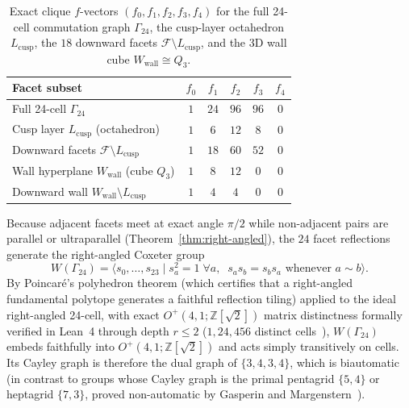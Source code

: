 \begin{table}[tb]
\centering
\caption{Exact clique $f$-vectors $(f_0, f_1, f_2, f_3, f_4)$ for the full 24-cell commutation graph $\Gamma_{24}$, the cusp-layer octahedron $L_{\mathrm{cusp}}$, the $18$ downward facets $\mathcal{F} \setminus L_{\mathrm{cusp}}$, and the 3D wall cube $W_{\mathrm{wall}} \cong Q_3$.}
\label{tab:clique-fvectors}
\small
\begin{tabular}{@{}lccccc@{}}
\toprule
Facet subset & $f_0$ & $f_1$ & $f_2$ & $f_3$ & $f_4$ \\
\midrule
Full 24-cell $\Gamma_{24}$ & $1$ & $24$ & $96$ & $96$ & $0$ \\
Cusp layer $L_{\mathrm{cusp}}$ (octahedron) & $1$ & $6$ & $12$ & $8$ & $0$ \\
Downward facets $\mathcal{F} \setminus L_{\mathrm{cusp}}$ & $1$ & $18$ & $60$ & $52$ & $0$ \\
Wall hyperplane $W_{\mathrm{wall}}$ (cube $Q_3$) & $1$ & $8$ & $12$ & $0$ & $0$ \\
Downward wall $W_{\mathrm{wall}} \setminus L_{\mathrm{cusp}}$ & $1$ & $4$ & $4$ & $0$ & $0$ \\
\bottomrule
\end{tabular}
\end{table}

Because adjacent facets meet at exact angle $\pi/2$ while non-adjacent pairs are parallel or ultraparallel (Theorem~\ref{thm:right-angled}), the $24$ facet reflections generate the right-angled Coxeter group~\cite{davis2008racg}
\begin{equation}
\label{eq:racg-pres}
W(\Gamma_{24}) = \bigl\langle s_0, \dots, s_{23} \;\big|\; s_a^2 = 1 \;\forall a,\;\; s_a s_b = s_b s_a \text{ whenever } a \sim b \bigr\rangle.
\end{equation}
By Poincar\'e's polyhedron theorem (which certifies that a right-angled fundamental polytope generates a faithful reflection tiling) applied to the ideal right-angled 24-cell, with exact $O^+(4,1;\mathbb{Z}[\sqrt{2}])$ matrix distinctness formally verified in Lean~4 through depth $r \le 2$ ($1, 24, 456$ distinct cells~\cite{pollard2026repo}), $W(\Gamma_{24})$ embeds faithfully into $O^+(4,1;\mathbb{Z}[\sqrt{2}])$ and acts simply transitively on cells. Its Cayley graph is therefore the dual graph of $\{3,4,3,4\}$, which is biautomatic~\cite{brink1993,davis2008racg} (in contrast to groups whose Cayley graph is the primal pentagrid $\{5,4\}$ or heptagrid $\{7,3\}$, proved non-automatic by Gasperin and Margenstern~\cite{margenstern2014gasperin}).

